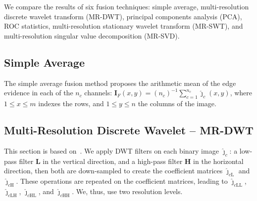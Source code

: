 \documentclass[journal]{IEEEtran}
\begin{document}

We compare the results of six fusion techniques:
simple average, 
multi-resolution discrete wavelet transform (MR-DWT),
principal components analysis (PCA), 
ROC statistics,
multi-resolution stationary wavelet transform (MR-SWT), and
multi-resolution singular value decomposition (MR-SVD).



\subsection{Simple Average}
The simple average fusion method proposes the arithmetic mean of the edge evidence in each of the $n_c$ channels:
$\bm I_F(x,y)=(n_c)^{-1}\sum_{c=1}^{n_c} \widehat{\bm\jmath}_c(x,y)$,
where $1\leq x\leq m$ indexes the rows, and $1\leq y\leq n$ the columns of the image.

\subsection{Multi-Resolution Discrete Wavelet -- MR-DWT} 
This section is based on~\cite{n_r}.
We apply DWT filters on each binary image $\bm{\widehat\jmath}_c$: a low-pass filter $\bm L$ in the vertical direction, and a high-pass filter $\bm H$ in the horizontal direction, then both are down-sampled to create the coefficient matrices $\bm{\widehat\jmath}_{c\text{L}}$ and $\bm{\widehat\jmath}_{c\text{H}}$.
These operations are repeated on the coefficient matrices, leading to $\bm{\widehat\jmath}_{c\text{LL}}$, $\bm{\widehat\jmath}_{c\text{LH}}$, $\bm{\widehat\jmath}_{c\text{HL}}$, and $\bm{\widehat\jmath}_{c\text{HH}}$.
We, thus, use two resolution levels.
\end{document}
